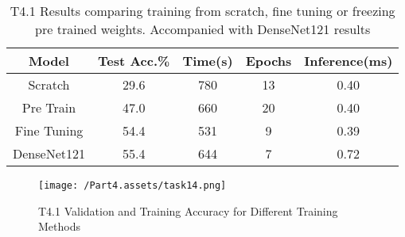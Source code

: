\documentclass[10pt,twocolumn,letterpaper]{article}
\begin{document}
\begin{table}[ht]
    \small
    \centering
    \begin{tabular}{|c|c|c|c|c|}
        \hline
        Model & Test Acc.\% & Time(s) & Epochs & Inference(ms) \\
        \hline
        Scratch  & 29.6 & 780 & 13  & 0.40 \\
        Pre Train &  47.0 & 660 & 20 & 0.40 \\
        Fine Tuning & 54.4 & 531 & 9 & 0.39 \\
        DenseNet121 & 55.4 & 644 & 7 & 0.72 \\
        \hline
    \end{tabular}
    \medbreak
    \caption{T4.1 Results comparing training from scratch, fine tuning or freezing pre trained weights. Accompanied with DenseNet121 results}
    \vspace{-0.4cm}
    \label{table:t41}
\end{table}


\begin{figure}[ht]
    \begin{center}
        \texttt{[image: /Part4.assets/task14.png]}
        \caption{T4.1 Validation and Training Accuracy for Different Training Methods}\label{fig:t41}
        \vspace{-1cm}
    \end{center}
\end{figure}
\end{document}
